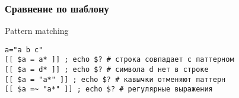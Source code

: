 \begin{frame}[fragile]
    \frametitle{ Сравнение по шаблону}
    \begin{block}{ Pattern matching}
	\small\begin{lstlisting}
a="a b c"
[[ $a = a* ]] ; echo $? # строка совпадает с паттерном
[[ $a = d* ]] ; echo $? # символа d нет в строке
[[ $a = "a*" ]] ; echo $? # кaвычки отменяют паттерн
[[ $a =~ "a*" ]] ; echo $? # регулярные выражения
\end{lstlisting}
    \end{block}
\end{frame}
